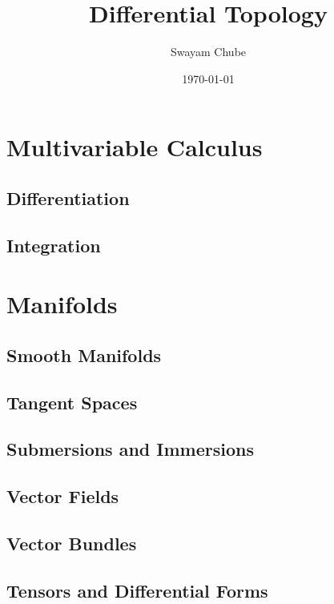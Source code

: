 \documentclass{report}
\title{Differential Topology}
\author{Swayam Chube}
\date{\today}
\begin{document}
\maketitle
\tableofcontents

\part{Multivariable Calculus}
\chapter{Differentiation}


\chapter{Integration}


\part{Manifolds}
\chapter{Smooth Manifolds}


\chapter{Tangent Spaces}


\chapter{Submersions and Immersions}


\chapter{Vector Fields}


\chapter{Vector Bundles}


\chapter{Tensors and Differential Forms}

\end{document}

